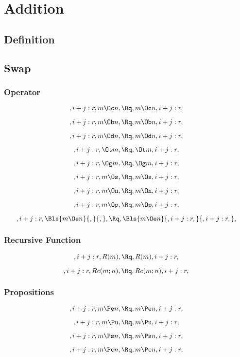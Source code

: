 \chapter{Addition} 

\bigskip
\bigskip
\section{Definition}



\bigskip
\bigskip
\section{Swap}
\subsection{Operator}
\[, i+j:r, m \Oc n, \Rq , m \Oc n, i+j:r,\]

\[, i+j:r, m \Ob n, \Rq , m \Ob n, i+j:r,\]

\[, i+j:r, m \Od n, \Rq , m \Od n, i+j:r,\]

\[, i+j:r, \Ot m, \Rq , \Ot m, i+j:r,\]

\[, i+j:r, \Og m, \Rq , \Og m, i+j:r,\]

\[, i+j:r, m \Os, \Rq , m \Os, i+j:r,\]

\[, i+j:r, m \On, \Rq , m \On, i+j:r,\]

\[, i+j:r, m \Op, \Rq , m \Op, i+j:r,\]


\[, i+j:r, \Bls{m \Oe n}{,}{,}, \Rq , \Bls{m \Oe n}{, i+j:r,}{, i+j:r,},\]


\bigskip
\bigskip
\subsection{Recursive Function}
\[, i+j:r, R(m), \Rq , R(m), i+j:r,\]

\[, i+j:r, Rc(m;n), \Rq , Rc(m;n), i+j:r,\]



\bigskip
\bigskip
\subsection{Propositions}
\[, i+j:r, m \Pe n, \Rq , m \Pe n, i+j:r,\]

\[, i+j:r, m \Pu, \Rq , m \Pu, i+j:r,\]

\[, i+j:r, m \Ps n, \Rq , m \Ps n, i+j:r,\]

\[, i+j:r, m \Pc n, \Rq , m \Pc n, i+j:r,\]

